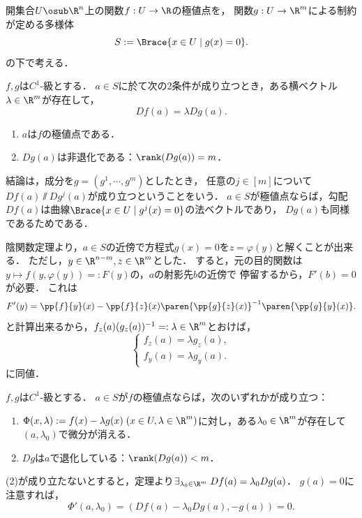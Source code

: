 \documentclass[uplatex,dvipdfmx]{jsreport}
\begin{document}
\begin{problem}
    開集合$U\osub\R^n$上の関数$f:U\to\R$の極値点を，
    関数$g:U\to\R^m$による制約が定める多様体
    \[S:=\Brace{x\in U\mid g(x)=0}.\]
    の下で考える．
\end{problem}

\begin{theorem}
    $f,g$は$C^1$-級とする．
    $a\in S$に於て次の2条件が成り立つとき，ある横ベクトル$\lambda\in\R^m$が存在して，
    \[Df(a)=\lambda Dg(a).\]
    \begin{enumerate}
        \item $a$は$f$の極値点である．
        \item $Dg(a)$は非退化である：$\rank(Dg(a))=m$．
    \end{enumerate}
\end{theorem}
\begin{remarks}[勾配ベクトルの消息]
    結論は，成分を$g=(g^1,\cdots,g^m)$としたとき，
    任意の$j\in[m]$について$Df(a)\varparallel Dg^j(a)$が成り立つということをいう．
    $a\in S$が極値点ならば，勾配$Df(a)$は曲線$\Brace{x\in U\mid g^j(x)=0}$の法ベクトルであり，
    $Dg(a)$も同様であるためである．
\end{remarks}
\begin{Proof}
    陰関数定理より，$a\in S$の近傍で方程式$g(x)=0$を$z=\varphi(y)$と解くことが出来る．
    ただし，$y\in\R^{n-m},z\in\R^m$とした．
    すると，元の目的関数は$y\mapsto f(y,\varphi(y))=:F(y)$の，$a$の射影先$b$の近傍で
    停留するから，$F'(b)=0$が必要．
    これは
    \[F'(y)=\pp{f}{y}(x)-\pp{f}{z}(x)\paren{\pp{g}{z}(x)}^{-1}\paren{\pp{g}{y}(x)}.\]
    と計算出来るから，$f_z(a)(g_z(a))^{-1}=:\lambda\in\R^m$とおけば，
    \[\begin{cases}
        f_z(a)=\lambda g_z(a),\\
        f_y(a)=\lambda g_y(a).
    \end{cases}\]
    に同値．
\end{Proof}

\begin{corollary}
    $f,g$は$C^1$-級とする．
    $a\in S$が$f$の極値点ならば，次のいずれかが成り立つ：
    \begin{enumerate}
        \item $\Phi(x,\lambda):=f(x)-\lambda g(x)\;(x\in U,\lambda\in\R^m)$に対し，ある$\lambda_0\in\R^m$が存在して$(a,\lambda_0)$で微分が消える．
        \item $Dg$は$a$で退化している：$\rank(Dg(a))<m$．
    \end{enumerate}
\end{corollary}
\begin{Proof}
    (2)が成り立たないとすると，定理より$\exists_{\lambda_0\in\R^m}\;Df(a)=\lambda_0Dg(a)$．
    $g(a)=0$に注意すれば，
    \[\Phi'(a,\lambda_0)=(Df(a)-\lambda_0Dg(a),-g(a))=0.\]
\end{Proof}
\end{document}
